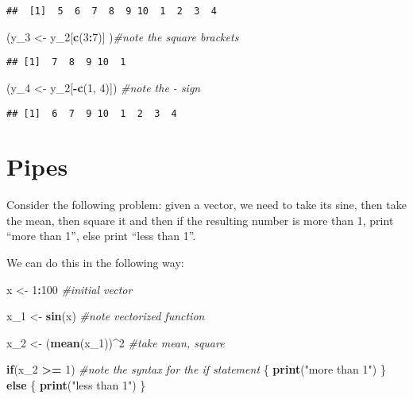 \documentclass[12pt,]{article}
\newenvironment{Shaded}{\begin{snugshade}}{\end{snugshade}}
\newcommand{\KeywordTok}[1]{\textcolor[rgb]{0.13,0.29,0.53}{\textbf{#1}}}
\newcommand{\DecValTok}[1]{\textcolor[rgb]{0.00,0.00,0.81}{#1}}
\newcommand{\StringTok}[1]{\textcolor[rgb]{0.31,0.60,0.02}{#1}}
\newcommand{\CommentTok}[1]{\textcolor[rgb]{0.56,0.35,0.01}{\textit{#1}}}
\newcommand{\ControlFlowTok}[1]{\textcolor[rgb]{0.13,0.29,0.53}{\textbf{#1}}}
\newcommand{\OperatorTok}[1]{\textcolor[rgb]{0.81,0.36,0.00}{\textbf{#1}}}
\newcommand{\NormalTok}[1]{#1}
\begin{document}
\begin{verbatim}
##  [1]  5  6  7  8  9 10  1  2  3  4
\end{verbatim}

\begin{Shaded}
\begin{Highlighting}[]
\NormalTok{(y_}\DecValTok{3}\NormalTok{ <-}\StringTok{ }\NormalTok{y_}\DecValTok{2}\NormalTok{[}\KeywordTok{c}\NormalTok{(}\DecValTok{3}\OperatorTok{:}\DecValTok{7}\NormalTok{)] )}\CommentTok{#note the square brackets}
\end{Highlighting}
\end{Shaded}

\begin{verbatim}
## [1]  7  8  9 10  1
\end{verbatim}

\begin{Shaded}
\begin{Highlighting}[]
\NormalTok{(y_}\DecValTok{4}\NormalTok{ <-}\StringTok{ }\NormalTok{y_}\DecValTok{2}\NormalTok{[}\OperatorTok{-}\KeywordTok{c}\NormalTok{(}\DecValTok{1}\NormalTok{, }\DecValTok{4}\NormalTok{)]) }\CommentTok{#note the - sign}
\end{Highlighting}
\end{Shaded}

\begin{verbatim}
## [1]  6  7  9 10  1  2  3  4
\end{verbatim}

\section{Pipes}\label{pipes}

Consider the following problem: given a vector, we need to take its
sine, then take the mean, then square it and then if the resulting
number is more than 1, print ``more than 1'', else print ``less than
1''.

We can do this in the following way:

\begin{Shaded}
\begin{Highlighting}[]
\NormalTok{x <-}\StringTok{ }\DecValTok{1}\OperatorTok{:}\DecValTok{100} \CommentTok{#initial vector}

\NormalTok{x_}\DecValTok{1}\NormalTok{ <-}\StringTok{ }\KeywordTok{sin}\NormalTok{(x) }\CommentTok{#note vectorized function}

\NormalTok{x_}\DecValTok{2}\NormalTok{ <-}\StringTok{ }\NormalTok{(}\KeywordTok{mean}\NormalTok{(x_}\DecValTok{1}\NormalTok{))}\OperatorTok{^}\DecValTok{2} \CommentTok{#take mean, square}

\ControlFlowTok{if}\NormalTok{(x_}\DecValTok{2} \OperatorTok{>=}\StringTok{ }\DecValTok{1}\NormalTok{) }\CommentTok{#note the syntax for the if statement}
\NormalTok{\{}
  \KeywordTok{print}\NormalTok{(}\StringTok{"more than 1"}\NormalTok{)}
\NormalTok{\} }\ControlFlowTok{else}
\NormalTok{\{}
  \KeywordTok{print}\NormalTok{(}\StringTok{"less than 1"}\NormalTok{)}
\NormalTok{\}}
\end{Highlighting}
\end{Shaded}
\end{document}
